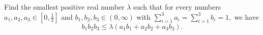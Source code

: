Find the smallest positive real number $\lambda$ such that for every numbers $a_1,a_2,a_3 \in \left[0, \frac{1}{2} \right]$ and $b_1,b_2,b_3 \in (0, \infty)$ with $\sum\limits_{i=1}^3a_i=\sum\limits_{i=1}^3b_i=1,$ we have $$b_1b_2b_3 \le \lambda (a_1b_1+a_2b_2+a_3b_3).$$